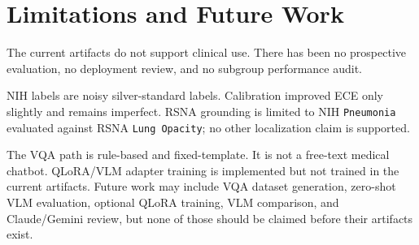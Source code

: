 \section{Limitations and Future Work}

The current artifacts do not support clinical use. There has been no prospective evaluation, no deployment review, and no subgroup performance audit.

NIH labels are noisy silver-standard labels. Calibration improved ECE only slightly and remains imperfect. RSNA grounding is limited to NIH \texttt{Pneumonia} evaluated against RSNA \texttt{Lung Opacity}; no other localization claim is supported.

The VQA path is rule-based and fixed-template. It is not a free-text medical chatbot. QLoRA/VLM adapter training is implemented but not trained in the current artifacts. Future work may include VQA dataset generation, zero-shot VLM evaluation, optional QLoRA training, VLM comparison, and Claude/Gemini review, but none of those should be claimed before their artifacts exist.
